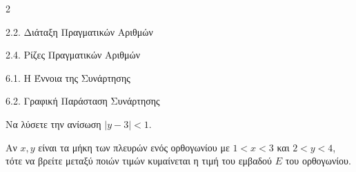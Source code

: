 \begin{ylh}{2}
    \item 2.2. Διάταξη Πραγματικών Αριθμών
    \item 2.4. Ρίζες Πραγματικών Αριθμών
    \item 6.1. Η Έννοια της Συνάρτησης
    \item 6.2. Γραφική Παράσταση Συνάρτησης
\end{ylh}

\begin{alist}
\item Να λύσετε την ανίσωση $|y - 3| < 1$.
\item Αν $x, y$ είναι τα μήκη των πλευρών ενός ορθογωνίου με $1 < x < 3$ και $2 < y < 4$, τότε να βρείτε μεταξύ ποιών τιμών κυμαίνεται η τιμή του εμβαδού $E$ του ορθογωνίου.
\end{alist}

